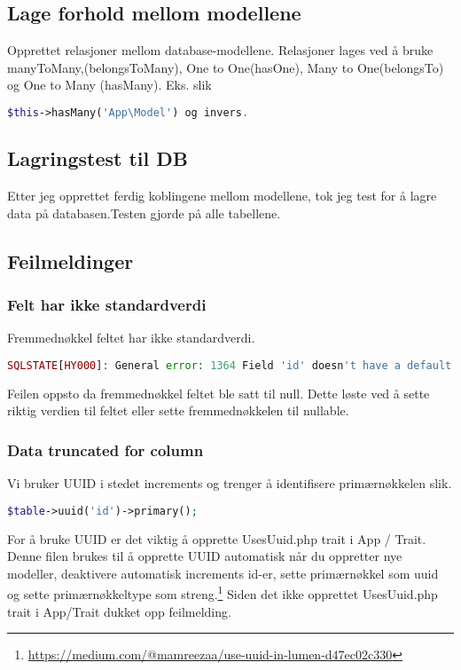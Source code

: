 \subsection{Lage forhold mellom modellene}
Opprettet relasjoner mellom database-modellene. 
Relasjoner  lages ved å bruke  manyToMany,(belongsToMany), One to One(hasOne), Many to One(belongsTo) og  One to Many (hasMany). Eks.  slik  

\begin{lstlisting}[language=PHP]
    $this->hasMany('App\Model') og invers.
\end{lstlisting}

\subsection{Lagringstest til DB}
Etter jeg opprettet ferdig koblingene mellom modellene, tok jeg test for å lagre data på databasen.Testen gjorde på alle tabellene.

\subsection{Feilmeldinger}
\subsubsection{Felt har ikke  standardverdi}
Fremmednøkkel feltet har ikke  standardverdi.

\begin{lstlisting}[language=PHP]
    SQLSTATE[HY000]: General error: 1364 Field 'id' doesn't have a default value (SQL: insert into `fields` (`name`, `slug`, `updated_at`, `created_at`) values (HELLO WORLD, hello_world, 2019-02-06 08:57:48, 2019-02-06 08:57:48))
\end{lstlisting}

Feilen oppsto da fremmednøkkel feltet ble satt til null. Dette løste ved å sette riktig verdien til feltet eller sette fremmednøkkelen til nullable. 

\subsubsection{Data truncated for column}
Vi bruker UUID i stedet increments og trenger å identifisere primærnøkkelen slik.
\begin{lstlisting}[language=PHP]
    $table->uuid('id')->primary();
\end{lstlisting}

For å bruke UUID er det viktig å opprette UsesUuid.php trait i App / Trait.
Denne filen brukes til å opprette UUID automatisk når du oppretter nye modeller, deaktivere automatisk increments id-er, sette primærnøkkel som uuid og sette primærnøkkeltype som streng.\footnote{
\url{https://medium.com/@mamreezaa/use-uuid-in-lumen-d47ec02c330}}
Siden det ikke opprettet UsesUuid.php trait i App/Trait dukket opp feilmelding. 

